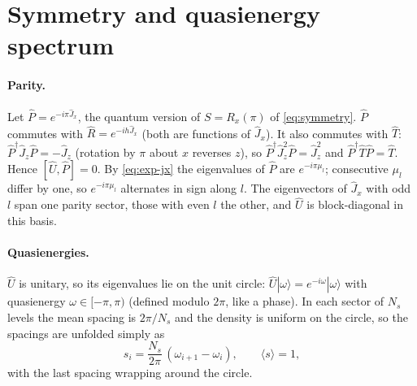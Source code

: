 \documentclass[11pt,a4paper]{article}
\begin{document}
\section{Symmetry and quasienergy spectrum}\label{sec:qspectrum}

\paragraph{Parity.} Let $\hat P = e^{-i\pi\hat J_x}$, the quantum version of $S = R_x(\pi)$ of \eqref{eq:symmetry}.
$\hat P$ commutes with $\hat R = e^{-ih\hat J_x}$ (both are functions of $\hat J_x$). It also commutes with $\hat T$: $\hat
P^\dagger\hat J_z\hat P = -\hat J_z$ (rotation by $\pi$ about $x$ reverses $z$), so $\hat P^\dagger\hat J_z^2\hat P = \hat
J_z^2$ and $\hat P^\dagger\hat T\hat P = \hat T$. Hence $[\hat U, \hat P] = 0$. By \eqref{eq:exp-jx} the eigenvalues of
$\hat P$ are $e^{-i\pi\mu_l}$; consecutive $\mu_l$ differ by one, so $e^{-i\pi\mu_l}$ alternates in sign along $l$. The
eigenvectors of $\hat J_x$ with odd $l$ span one parity sector, those with even $l$ the other, and $\hat U$ is
block-diagonal in this basis.

\paragraph{Quasienergies.} $\hat U$ is unitary, so its eigenvalues lie on the unit circle:
$\hat U|\omega\rangle = e^{-i\omega}|\omega\rangle$ with quasienergy $\omega \in [-\pi, \pi)$
(defined modulo $2\pi$, like a phase). In each sector of $N_s$ levels the mean spacing is $2\pi/N_s$ and the density is
uniform on the circle, so the spacings are unfolded simply as
\begin{equation}\label{eq:unfold}
  s_i = \frac{N_s}{2\pi}\,(\omega_{i+1} - \omega_i), \qquad \langle s\rangle = 1 ,
\end{equation}
with the last spacing wrapping around the circle.
\end{document}
